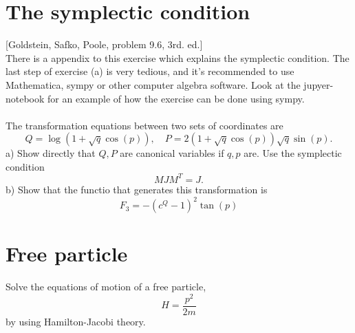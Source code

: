 \documentclass{article}
\begin{document}
    \section{The symplectic condition}
        [Goldstein, Safko, Poole, problem 9.6, 3rd. ed.] \\
        There is a appendix to this exercise which explains the symplectic condition. The last step of exercise (a) is very tedious, and it's recommended to use Mathematica, sympy or other computer algebra software. Look at the jupyer-notebook for an example of how the exercise can be done using sympy. \\ \\
        The transformation equations between two sets of coordinates are
        \begin{equation*}
            Q = \log\left(1 + \sqrt{q} \cos(p)\right), \quad P = 2\left(1 + \sqrt{q}\cos(p)\right)\sqrt{q}\sin(p).
        \end{equation*}
        a) Show directly that $Q, P$ are canonical variables if $q, p$ are. Use the symplectic condition 
        \begin{equation*}
            M J M^T = J.
        \end{equation*}
        b) Show that the functio that generates this transformation is 
        \begin{equation*}
            F_3 = -(c^Q - 1)^2 \tan(p)
        \end{equation*}

    \section{Free particle}
        Solve the equations of motion of a free particle, 
        \begin{equation*}
            H = \frac{p^2}{2m}
        \end{equation*}
        by using Hamilton-Jacobi theory.
\end{document}
